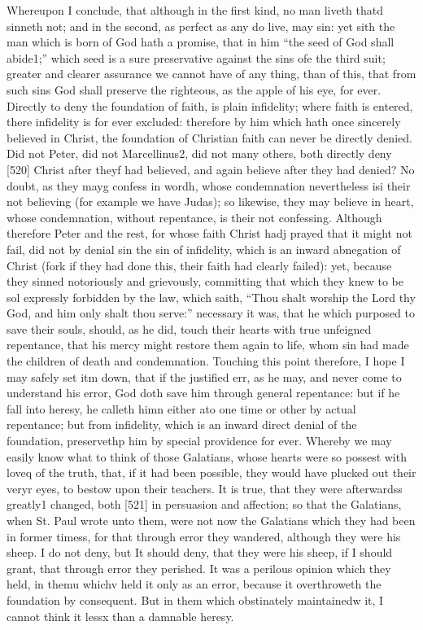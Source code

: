 Whereupon I conclude, that although in the first kind, no man liveth thatd sinneth not; and in the second, as perfect as any do live, may sin: yet sith the man which is born of God hath a promise, that in him “the seed of God shall abide1;” which seed is a sure preservative against the sins ofe the third suit; greater and clearer assurance we cannot have of any thing, than of this, that from such sins God shall preserve the righteous, as the apple of his eye, for ever. Directly to deny the foundation of faith, is plain infidelity; where faith is entered, there infidelity is for ever excluded: therefore by him which hath once sincerely believed in Christ, the foundation of Christian faith can never be directly denied. Did not Peter, did not Marcellinus2, did not many others, both directly deny [520] Christ after theyf had believed, and again believe after they had denied? No doubt, as they mayg confess in wordh, whose condemnation nevertheless isi their not believing (for example we have Judas); so likewise, they may believe in heart, whose condemnation, without repentance, is their not confessing. Although therefore Peter and the rest, for whose faith Christ hadj prayed that it might not fail, did not by denial sin the sin of infidelity, which is an inward abnegation of Christ (fork if they had done this, their faith had clearly failed): yet, because they sinned notoriously and grievously, committing that which they knew to be sol expressly forbidden by the law, which saith, “Thou shalt worship the Lord thy God, and him only shalt thou serve:” necessary it was, that he which purposed to save their souls, should, as he did, touch their hearts with true unfeigned repentance, that his mercy might restore them again to life, whom sin had made the children of death and condemnation. Touching this point therefore, I hope I may safely set itm down, that if the justified err, as he may, and never come to understand his error, God doth save him through general repentance: but if he fall into heresy, he calleth himn either ato one time or other by actual repentance; but from infidelity, which is an inward direct denial of the foundation, preservethp him by special providence for ever. Whereby we may easily know what to think of those Galatians, whose hearts were so possest with loveq of the truth, that, if it had been possible, they would have plucked out their veryr eyes, to bestow upon their teachers. It is true, that they were afterwardss greatly1 changed, both [521] in persuasion and affection; so that the Galatians, when St. Paul wrote unto them, were not now the Galatians which they had been in former timess, for that through error they wandered, although they were his sheep. I do not deny, but It should deny, that they were his sheep, if I should grant, that through error they perished. It was a perilous opinion which they held, in themu whichv held it only as an error, because it overthroweth the foundation by consequent. But in them which obstinately maintainedw it, I cannot think it lessx than a damnable heresy.

